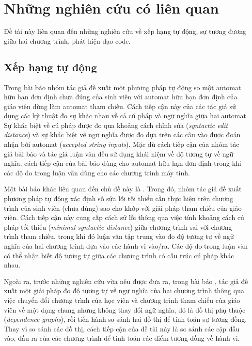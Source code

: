 \section{Những nghiên cứu có liên quan}

Đề tài này liên quan đến những nghiên cứu về xếp hạng tự động, sự
tương đương giữa hai chương trình, phát hiện đạo code.

\subsection*{Xếp hạng tự động}
	
Trong bài báo \cite{alur2013automated} nhóm tác giả đề xuất một phương
pháp tự động so một automat hữu hạn đơn định chưa đúng của sinh viên
với automat hữu hạn đơn định của giáo viên dùng làm automat tham
chiếu. Cách tiếp cận này của các tác giả sử dụng các kỹ thuật đo sự
khác nhau về cả cú pháp và ngữ nghĩa giữa hai automat. Sự khác biệt về
cú pháp được đo qua khoảng cách chỉnh sửa (\emph{syntactic edit
  distance}) và sự khác biệt về ngữ nghĩa được đo dựa trên các
câu vào được đoán nhận bởi automat (\emph{accepted string
  inputs}). Mặc dù cách tiếp cận của nhóm tác giả bài báo và tác giả
luận văn đều sử dụng khái niệm về độ tương tự về ngữ nghĩa, cách tiếp
cận của bài báo dùng cho automat hữu hạn đơn định trong khi các độ đo
trong luận văn dùng cho các chương trình máy tính.

Một bài báo khác liên quan đến chủ đề này là \cite{singh2013automated}. Trong đó, nhóm tác giả đề xuất phương pháp tự động
xác định số sửa lỗi tối thiểu cần thực hiện trên chương trình của sinh viên (chưa đúng) sao cho khớp với giải pháp tham chiếu của giáo viên. Cách tiếp cận này cung cấp cách sử lỗi thông qua việc tính khoảng cách cú pháp tối thiểu (\emph{minimal syntactic distance}) giữa chương trình sai với chương trình tham chiếu, trong khi đó luận văn tập trung vào đo độ tương tự về ngữ nghĩa của hai chương trình dựa vào các hành vi vào/ra. Các độ đo trong luận văn có thể nhận biết độ tương tự giữa các chương trình có cấu trúc cú pháp khác nhau.

Ngoài ra, trước những nghiên cứu vừa nêu được đưa ra, trong bài báo
\cite{wang2007semantic}, tác giả đề xuất một giải pháp đo độ tương tự
về ngữ nghĩa của hai chương trình thông qua việc chuyển đổi chương
trình của học viên và chương trình tham chiếu của giáo viên về một
dạng chung nhưng không thay đổi ngữ nghĩa, đó là đồ thị phụ thuộc
(\emph{dependence graphs}), rồi tiến hành so sánh hai đồ thị để tính
toán sự tương đồng. Thay vì so sánh các đồ thị, cách tiếp cận của đề
tài này là so sánh các cặp đầu vào, đầu ra của các chương trình để
tính toán các điểm tương đồng về hành vi.
	
